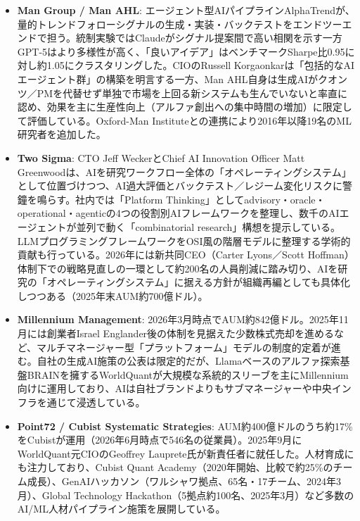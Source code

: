 \begin{itemize}
  \item \textbf{Man Group / Man AHL}: エージェント型AIパイプラインAlphaTrendが、量的トレンドフォローシグナルの生成・実装・バックテストをエンドツーエンドで担う。統制実験ではClaudeがシグナル提案間で高い相関を示す一方GPT-5はより多様性が高く、「良いアイデア」はベンチマークSharpe比0.95に対し約1.05にクラスタリングした\cite{manndalphatrend}。CIOのRussell Korgaonkarは「包括的なAIエージェント群」の構築を明言する一方\cite{man2025bigimperative}、Man AHL自身は生成AIがクオンツ／PMを代替せず単独で市場を上回る新システムも生んでいないと率直に認め、効果を主に生産性向上（アルファ創出への集中時間の増加）に限定して評価している\cite{man2024bigpicture}。Oxford-Man Instituteとの連携により2016年以降19名のML研究者を追加した\cite{man2026riseofml}。
  \item \textbf{Two Sigma}: CTO Jeff WeckerとChief AI Innovation Officer Matt Greenwoodは、AIを研究ワークフロー全体の「オペレーティングシステム」として位置づけつつ、AI過大評価とバックテスト／レジーム変化リスクに警鐘を鳴らす\cite{twosigma2026aifirst}。社内では「Platform Thinking」としてadvisory・oracle・operational・agenticの4つの役割別AIフレームワークを整理し\cite{twosigmandplatformthinking}、数千のAIエージェントが並列で動く「combinatorial research」構想を提示している\cite{twosigma2026aioutlook2}。LLMプログラミングフレームワークをOSI風の階層モデルに整理する学術的貢献も行っている\cite{twosigmandllmabstractions}。2026年には新共同CEO（Carter Lyons／Scott Hoffman）体制下での戦略見直しの一環として約200名の人員削減に踏み切り、AIを研究の「オペレーティングシステム」に据える方針が組織再編としても具体化しつつある（2025年末AUM約700億ドル）\cite{x03twosigma_hedgeweek2026,x03twosigma_bloomberg2026}。
  \item \textbf{Millennium Management}: 2026年3月時点でAUM約842億ドル。2025年11月には創業者Israel Englander後の体制を見据えた少数株式売却を進めるなど、マルチマネージャー型「プラットフォーム」モデルの制度的定着が進む\cite{x03millennium_bloomberg2025}。自社の生成AI施策の公表は限定的だが、Llamaベースのアルファ探索基盤BRAINを擁するWorldQuant\cite{forbes2025worldquant}が大規模な系統的スリーブを主にMillennium向けに運用しており、AIは自社ブランドよりもサブマネージャーや中央インフラを通じて浸透している。
  \item \textbf{Point72 / Cubist Systematic Strategies}: AUM約400億ドルのうち約17\%をCubistが運用（2026年6月時点で546名の従業員）。2025年9月にWorldQuant元CIOのGeoffrey Lauprete氏が新責任者に就任した\cite{bloomberg_cubistchief2025}。人材育成にも注力しており、Cubist Quant Academy（2020年開始、比較で約25\%のチーム成長）\cite{point72_quantacademy2023,point72_5years2025}、GenAIハッカソン（ワルシャワ拠点、65名・17チーム、2024年3月）\cite{point72_genaipoland2024}、Global Technology Hackathon（5拠点約100名、2025年3月）\cite{point72_globalhackathon2025}など多数のAI/ML人材パイプライン施策を展開している。

\end{itemize}
